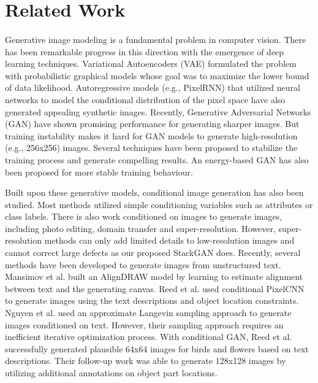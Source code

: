 \documentclass[a4paper,12pt,oneside]{article}
\begin{document}
\newpage
\section{Related Work}
\paragraph{}
Generative image modeling is a fundamental problem in computer vision. There has been remarkable progress in this direction with the emergence of deep learning techniques. Variational Autoencoders (VAE) formulated the problem with probabilistic graphical models whose goal was to maximize the lower bound of data likelihood. Autoregressive models (e.g., PixelRNN) that utilized neural networks to model the conditional distribution of the pixel space have also generated appealing synthetic images. Recently, Generative Adversarial Networks (GAN) have shown promising performance for generating sharper images. But training instability makes it hard for GAN models to generate high-resolution (e.g., 256x256) images. Several techniques have been proposed to stabilize the training process and generate compelling results. An energy-based GAN has also been proposed for more stable training behaviour. 

Built upon these generative models, conditional image generation has also been studied. Most methods utilized simple conditioning variables such as attributes or class labels. There is also work conditioned on images to generate images, including photo editing, domain transfer and super-resolution. However, super-resolution methods can only add limited details to low-resolution images and cannot correct large defects as our proposed StackGAN does. Recently, several methods have been developed to generate images from unstructured text. Mansimov et al. built an AlignDRAW model by learning to estimate alignment between text and the generating canvas. Reed et al. used conditional PixelCNN to generate images using the text descriptions and object location constraints. Nguyen et al. used an approximate Langevin sampling approach to generate images conditioned on text. However, their sampling approach requires an inefficient iterative optimization process. With conditional GAN, Reed et al. successfully generated plausible 64x64 images for birds and flowers based on text descriptions. Their follow-up work was able to generate 128x128 images by utilizing additional annotations on object part locations. 
\end{document}
